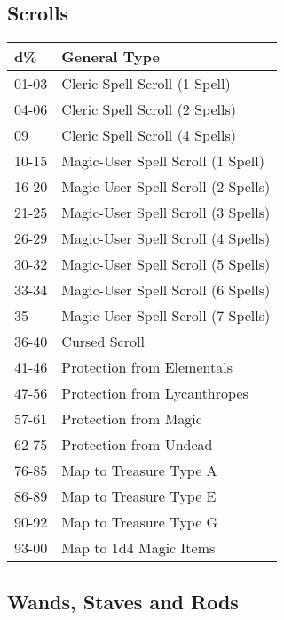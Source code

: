 \documentclass[a4paper,twoside,openany,10pt]{book}
\begin{document}
\begin{multicols}{2}

\subsection{Scrolls}\label{scrolls}

\begin{tabular*}{0.93\linewidth}{@{\extracolsep{\fill}}ll}
\textbf{d\%} & \textbf{General Type} \\\toprule
01-03 & Cleric Spell Scroll (1 Spell) \\\hline
04-06 & Cleric Spell Scroll (2 Spells) \\\hline
09 & Cleric Spell Scroll (4 Spells) \\\hline
10-15 & Magic-User Spell Scroll (1 Spell) \\\hline
16-20 & Magic-User Spell Scroll (2 Spells) \\\hline
21-25 & Magic-User Spell Scroll (3 Spells) \\\hline
26-29 & Magic-User Spell Scroll (4 Spells) \\\hline
30-32 & Magic-User Spell Scroll (5 Spells) \\\hline
33-34 & Magic-User Spell Scroll (6 Spells) \\\hline
35 & Magic-User Spell Scroll (7 Spells) \\\hline
36-40 & Cursed Scroll \\\hline
41-46 & Protection from Elementals \\\hline
47-56 & Protection from Lycanthropes \\\hline
57-61 & Protection from Magic \\\hline
62-75 & Protection from Undead \\\hline
76-85 & Map to Treasure Type A \\\hline
86-89 & Map to Treasure Type E \\\hline
90-92 & Map to Treasure Type G \\\hline
93-00 & Map to 1d4 Magic Items \\\bottomrule
\end{tabular*}

\subsection{Wands, Staves and Rods}\label{wands-staves-and-rods}


\end{multicols}
\end{document}
